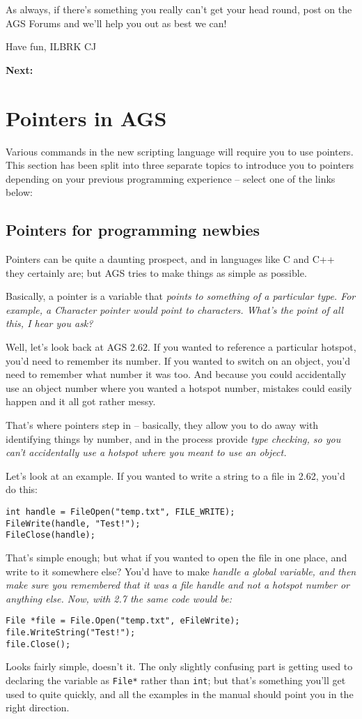 As always, if there's something you really can't get your head round, post on the
AGS Forums and we'll help you out as best we can!

Have fun, ILBRK
CJ

\bf{Next:} 


\section{Pointers in AGS}\label{Pointers}%

Various commands in the new scripting language will require you to use pointers.
This section has been split into three separate topics to introduce you
to pointers depending on your previous programming experience -- select one of the
links below:

\subsection{Pointers for programming newbies}\label{PointersForNewbies}%

Pointers can be quite a daunting prospect, and in languages like C and C++ they certainly
are; but AGS tries to make things as simple as possible.

Basically, a pointer is a variable that \it{points} to something of a particular type.
For example, a \it{Character} pointer would point to characters. What's the point of
all this, I hear you ask?

Well, let's look back at AGS 2.62. If you wanted to reference a particular hotspot,
you'd need to remember its number. If you wanted to switch on an object, you'd need to
remember what number it was too. And because you could accidentally use an object
number where you wanted a hotspot number, mistakes could easily happen and it all got
rather messy.

That's where pointers step in -- basically, they allow you to do away with identifying
things by number, and in the process provide \it{type checking}, so you can't accidentally
use a hotspot where you meant to use an object.

Let's look at an example. If you wanted to write a string to a file in 2.62, you'd do this:
\begin{verbatim}
int handle = FileOpen("temp.txt", FILE_WRITE);
FileWrite(handle, "Test!");
FileClose(handle);
\end{verbatim}
That's simple enough; but what if you wanted to open the file in one place, and write
to it somewhere else? You'd have to make \it{handle} a global variable, and then make
sure you remembered that it was a file handle and not a hotspot number or anything else.
Now, with 2.7 the same code would be:
\begin{verbatim}
File *file = File.Open("temp.txt", eFileWrite);
file.WriteString("Test!");
file.Close();
\end{verbatim}
Looks fairly simple, doesn't it. The only slightly confusing part is getting used
to declaring the variable as \verb$File*$ rather than \verb$int$; but that's something
you'll get used to quite quickly, and all the examples in the manual should point
you in the right direction.

